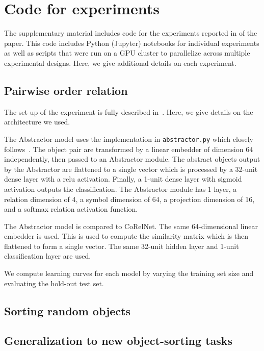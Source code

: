 \section{Code for experiments}
\label{sec:code}

The supplementary material includes code for the experiments reported in  of the paper. This code includes Python (Jupyter) notebooks for individual experiments as well as scripts that were run on a GPU cluster to parallelize across multiple experimental designs. Here, we give additional details on each experiment.

\subsection{Pairwise order relation}
The set up of the experiment is fully described in~. Here, we give details on the architecture we used.

The Abstractor model uses the implementation in \texttt{abstractor.py} which closely follows~. The object pair are transformed by a linear embedder of dimension $64$ independently, then passed to an Abstractor module. The abstract objects output by the Abstractor are flattened to a single vector which is processed by a 32-unit dense layer with a relu activation. Finally, a 1-unit dense layer with sigmoid activation outputs the classification. The Abstractor module has 1 layer, a relation dimension of 4, a symbol dimension of 64, a projection dimension of 16, and a softmax relation activation function.

The Abstractor model is compared to CoRelNet. The same 64-dimensional linear embedder is used. This is used to compute the similarity matrix which is then flattened to form a single vector. The same 32-unit hidden layer and 1-unit classification layer are used.

We compute learning curves for each model by varying the training set size and evaluating the hold-out test set.

\subsection{Sorting random objects}

\subsection{Generalization to new object-sorting tasks}

